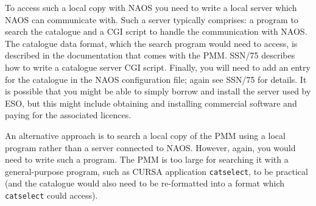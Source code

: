 \documentclass[twoside,11pt]{article}
\newcommand{\xref}[3]{#1}
\renewcommand{\_}{\texttt{\symbol{95}}}
\begin{document}
To access such a local copy with NAOS you need to write a local server
which NAOS can communicate with.  Such a server typically comprises: a
program to search the catalogue and a CGI script to handle the
communication with NAOS.  The catalogue data format, which the search
program would need to access, is described in the documentation that
comes with the PMM.  \xref{SSN/75}{ssn75}{}\cite{SSN75} describes how to
write a catalogue server CGI script.  Finally, you will need to add an
entry for the catalogue in the NAOS configuration file; again see SSN/75
for details.  It is possible that you might be able to simply borrow and
install the server used by ESO, but this might include obtaining and
installing commercial software and paying for the associated licences.

An alternative approach is to search a local copy of the PMM using a
local program rather than a server connected to NAOS.  However, again,
you would need to write such a program.  The PMM is too large for
searching it with a general-purpose program, such as CURSA application
{\tt catselect}, to be practical (and the catalogue would also need to
be re-formatted into a format which {\tt catselect} could access).
\end{document}

